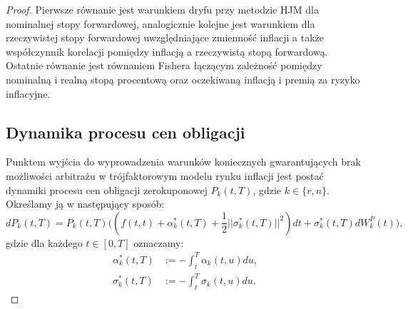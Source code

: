 \documentclass{mini}
\theoremstyle{mythstyle}
\begin{document}
	\begin{proof}
		
		Pierwsze równanie  jest warunkiem dryfu przy metodzie HJM dla nominalnej stopy forwardowej, analogicznie kolejne jest warunkiem dla rzeczywistej stopy forwardowej uwzględniające zmienność inflacji a także współczynnik korelacji pomiędzy inflacją a rzeczywistą stopą forwardową. Ostatnie równanie jest równaniem Fishera łączącym zależność pomiędzy nominalną i realną stopą procentową oraz oczekiwaną inflacją i premią za ryzyko inflacyjne. 

	\subsection*{Dynamika procesu cen obligacji}
	Punktem wyjścia do wyprowadzenia warunków koniecznych gwarantujących brak możliwości arbitrażu w trójfaktorowym modelu rynku inflacji jest postać dynamiki procesu cen obligacji zerokuponowej $P_k(t,T)$, gdzie $k \in\{r,n\}$. Określamy ją w następujący sposób:
	\begin{equation*}
	dP_k(t,T) = P_k(t,T) \bigg((f(t,t)+\alpha_k^*(t,T)+\frac{1}{2} ||\sigma_k^*(t,T)||^2 )dt +\sigma_k^*(t,T) dW_k^P(t)\bigg),
	\end{equation*}
	gdzie dla każdego $t\in[0,T]$ oznaczamy:
	\begin{align}
	\alpha_k^*(t,T) &:= - \int_{t}^{T} \alpha_k(t,u) du,\\
	\sigma_k^*(t,T) &:= - \int_{t}^{T} \sigma_k(t,u) du.
	\end{align}

\end{proof}
\end{document}
